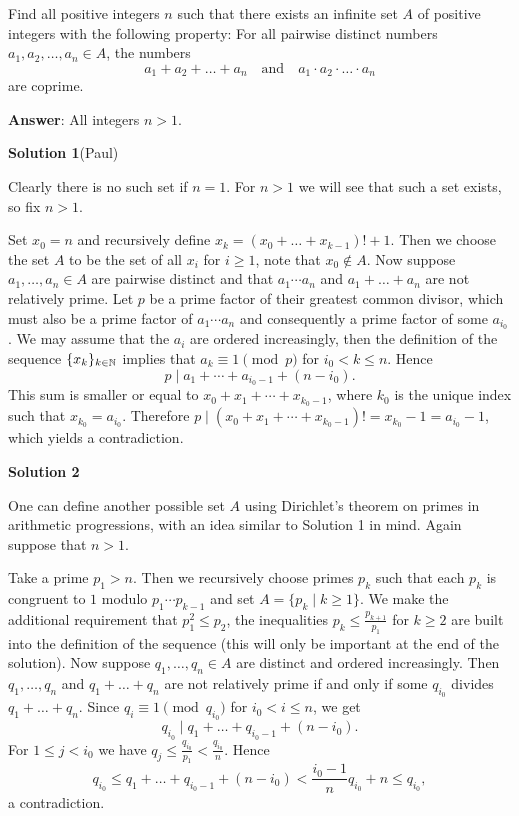 Find all positive integers $n$ such that there exists an infinite set $A$ of positive integers with the following property: For all pairwise distinct numbers $a_1,a_2,\ldots,a_n\in A$, the numbers 
\[
a_1+a_2+\ldots+a_n\quad \text{and}\quad a_1\cdot a_2\cdot\ldots\cdot a_n
\]
are coprime.

\textbf{Answer}: All integers $n>1$.

\textbf{Solution 1}(Paul)

Clearly there is no such set if $n=1$. For $n>1$ we will see that such a set exists, so fix $n>1$.

Set $x_0=n$ and recursively define $x_k = (x_0 + \ldots + x_{k-1})! + 1$. Then we choose the set $A$ to be the set of all $x_i$ for $i\geq 1$, note that $x_0 \notin A$. Now suppose $a_1,\ldots ,a_n \in A$ are pairwise distinct and that $a_1\cdots a_n$ and $a_1+\ldots + a_n$ are not relatively prime. Let $p$ be a prime factor of their greatest common divisor, which must also be a prime factor of $a_1\cdots a_n$ and consequently a prime factor of some $a_{i_0}$. We may assume that the $a_i$ are ordered increasingly, then the definition of the sequence $\{x_k\}_{k\in\mathbb{N}}$ implies that $a_k \equiv 1 \pmod{p}$ for $i_0 < k \leq n$. Hence
\[
p \mid a_1 + \cdots + a_{i_0 - 1} + (n-i_0).
\]
This sum is smaller or equal to $x_0 + x_1 + \cdots + x_{k_0 - 1}$, where $k_0$ is the unique index such that $x_{k_0} = a_{i_0}$. Therefore $p \mid (x_0 + x_1 + \cdots + x_{k_0 - 1})! = x_{k_0} - 1 = a_{i_0} - 1$, which yields a contradiction.

\textbf{Solution 2}

One can define another possible set $A$ using Dirichlet's theorem on primes in arithmetic progressions, with an idea similar to Solution 1 in mind. Again suppose that $n>1$.

Take a prime $p_1 > n$. Then we recursively choose primes $p_k$ such that each $p_k$ is congruent to $1$ modulo $p_1\cdots p_{k-1}$ and set $A = \{p_k \mid k\geq 1\}$. We make the additional requirement that $p_1^2 \leq p_2$, the inequalities $p_k \leq \tfrac{p_{k+1}}{p_1}$ for $k\geq 2$ are built into the definition of the sequence (this will only be important at the end of the solution). Now suppose $q_1, \ldots ,q_n \in A$ are distinct and ordered increasingly. Then $q_1, \ldots ,q_n$ and $q_1 + \ldots + q_n$ are not relatively prime if and only if some $q_{i_0}$ divides $q_1 + \ldots + q_n$. Since $q_i \equiv 1 \pmod{q_{i_0}}$ for $i_0 < i \leq n$, we get
\[
q_{i_0} \mid q_1 + \ldots + q_{i_0 - 1} + (n-i_0).
\]
For $1 \leq j < i_0$ we have $q_j \leq \tfrac{q_{i_0}}{p_1} < \tfrac{q_{i_0}}{n}$. Hence
\[
q_{i_0} \leq q_1 + \ldots + q_{i_0 - 1} + (n-i_0) < \frac{i_0 - 1}{n}q_{i_0} + n \leq q_{i_0},
\]
a contradiction.

